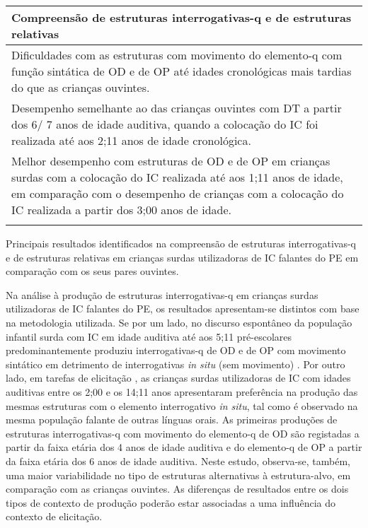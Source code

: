 \documentclass[output=paper,colorlinks,citecolor=brown,booklanguage=portuguese]{langscibook}
\begin{document}
\begin{Tabela}
\begin{tabularx}{.8\textwidth}{Q}
\lsptoprule
\textbf{Compreensão de estruturas interrogativas-q e de estruturas relativas} \\
\midrule

Dificuldades com as estruturas com movimento do elemento-q
com função sintática de OD e de OP até idades cronológicas
mais tardias do que as crianças ouvintes.\\
\tablevspace


Desempenho semelhante ao das crianças ouvintes com DT a
partir dos 6/ 7 anos de idade auditiva, quando a colocação do IC
foi realizada até aos 2;11 anos de idade cronológica.\\
\tablevspace


Melhor desempenho com estruturas de OD e de OP em crianças
surdas com a colocação do IC realizada até aos 1;11 anos de
idade, em comparação com o desempenho de crianças com a
colocação do IC realizada a partir dos 3;00 anos de idade.\\
\lspbottomrule
\end{tabularx}

\caption{{Principais resultados identificados na compreensão de estruturas interrogativas-q e de estruturas relativas em crianças surdas utilizadoras de IC falantes do PE em comparação com os seus pares ouvintes.}}
\label{tab:Tabela3}
\end{Tabela}

Na análise à produção de estruturas interrogativas-q em crianças surdas utilizadoras de IC falantes do PE, os resultados apresentam-se distintos com base na metodologia utilizada. Se por um lado, no discurso espontâneo da população infantil surda com IC em idade auditiva até aos 5;11 pré-escolares predominantemente produziu interrogativas-q de OD e de OP com movimento sintático em detrimento de interrogativas \emph{in situ} (sem movimento) \citep{Costa2016a}. Por outro lado, em tarefas de elicitação \citep{Moita2018}, as crianças surdas utilizadoras de IC com idades auditivas entre os 2;00 e os 14;11 anos apresentaram preferência na produção das mesmas estruturas com o elemento interrogativo \emph{in situ}, tal como é observado na mesma população falante de outras línguas orais. As primeiras produções de estruturas interrogativas-q com movimento do elemento-q de OD são registadas a partir da faixa etária dos 4 anos de idade auditiva e do elemento-q de OP a partir da faixa etária dos 6 anos de idade auditiva. Neste estudo, observa-se, também, uma maior variabilidade no tipo de estruturas alternativas à estrutura-alvo, em comparação com as crianças ouvintes. As diferenças de resultados entre os dois tipos de contexto de produção poderão estar associadas a uma influência do contexto de elicitação.
\end{document}
